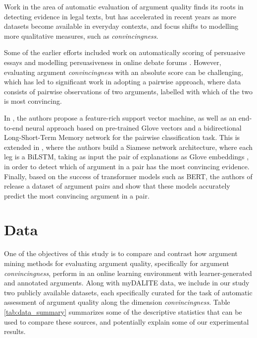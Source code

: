 \documentclass[runningheads]{llncs}
\begin{document}
Work in the area of automatic evaluation of argument quality finds its roots in 
detecting evidence in legal texts\cite{moens_automatic_2007}, but has 
accelerated in recent years as more datasets become available in everyday 
contexts, and focus shifts to modelling more qualitative measures, such as 
\textit{convincingness}. 

Some of the earlier efforts included work on automatically 
scoring of persuasive essays \cite{persing_end--end_2016} and modelling 
persuasiveness in online debate forums \cite{tan_winning_2016}. 
However, evaluating argument \textit{convincingness} with an absolute score can 
be challenging, which has led to significant work in adopting a pairwise 
approach, where data consists of pairwise observations of two arguments, 
labelled with which of the two is most convincing.

	
		

In \cite{habernal_which_2016}, the authors propose a feature-rich support 
vector machine, as well as an end-to-end neural approach based on pre-trained 
Glove vectors and a bidirectional Long-Short-Term Memory network for the 
pairwise classification task. 
This is extended in \cite{gleize_are_2019}, where the authors build a Siamese 
network architecture, where each leg is a BiLSTM, taking as input the pair of 
explanations as Glove embeddings \cite{pennington_glove:_2014}, in order to 
detect which of argument in a pair 
has the most convincing evidence.
Finally, based on the success of transformer models such as 
BERT\cite{devlin_bert_2018}, the authors of \cite{toledo_automatic_2019}  
release a dataset of argument pairs and show that these models accurately 
predict the most convincing argument in a pair.


\section{Data}

One of the objectives of this study is to compare and contrast how argument 
mining methods for evaluating argument quality, specifically for argument 
\textit{convincingness}, perform in an online learning environment with 
learner-generated and annotated arguments. Along with myDALITE data, we include 
in our study two publicly 
available datasets, each specifically curated for the task of automatic 
assessment of argument quality along the dimension \textit{convincingness}. 
Table \ref{tab:data_summary} summarizes some of the descriptive statistics that 
can be used to compare these sources, and potentially explain some of our 
experimental results.
\end{document}
